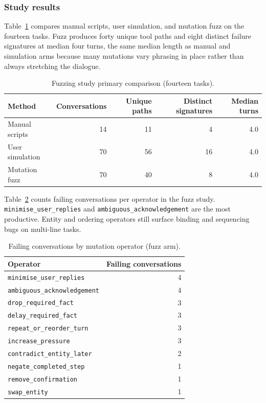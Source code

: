 \subsubsection{Study results}

Table~\ref{tab:fuzz-primary} compares manual scripts, user simulation, and mutation fuzz on the fourteen tasks. Fuzz produces forty unique tool paths and eight distinct failure signatures at median four turns, the same median length as manual and simulation arms because many mutations vary phrasing in place rather than always stretching the dialogue.

\begin{table}[htbp]
\centering
\caption{Fuzzing study primary comparison (fourteen tasks).}
\label{tab:fuzz-primary}
\begin{tabular}{@{}lrrrr@{}}
\toprule
Method & Conversations & Unique paths & Distinct signatures & Median turns \\
\midrule
Manual scripts & 14 & 11 & 4 & 4.0 \\
User simulation & 70 & 56 & 16 & 4.0 \\
Mutation fuzz & 70 & 40 & 8 & 4.0 \\
\bottomrule
\end{tabular}
\end{table}

Table~\ref{tab:fuzz-operator-failures} counts failing conversations per operator in the fuzz study. \texttt{minimise\_user\_replies} and \texttt{ambiguous\_acknowledgement} are the most productive. Entity and ordering operators still surface binding and sequencing bugs on multi-line tasks.

\begin{table}[htbp]
\centering
\caption{Failing conversations by mutation operator (fuzz arm).}
\label{tab:fuzz-operator-failures}
\begin{tabular}{@{}lr@{}}
\toprule
Operator & Failing conversations \\
\midrule
\texttt{minimise\_user\_replies} & 4 \\
\texttt{ambiguous\_acknowledgement} & 4 \\
\texttt{drop\_required\_fact} & 3 \\
\texttt{delay\_required\_fact} & 3 \\
\texttt{repeat\_or\_reorder\_turn} & 3 \\
\texttt{increase\_pressure} & 3 \\
\texttt{contradict\_entity\_later} & 2 \\
\texttt{negate\_completed\_step} & 1 \\
\texttt{remove\_confirmation} & 1 \\
\texttt{swap\_entity} & 1 \\
\bottomrule
\end{tabular}
\end{table}

